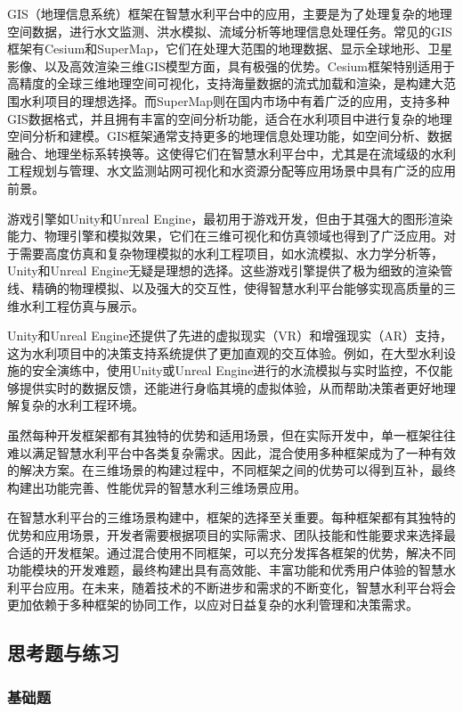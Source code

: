 GIS（地理信息系统）框架在智慧水利平台中的应用，主要是为了处理复杂的地理空间数据，进行水文监测、洪水模拟、流域分析等地理信息处理任务。常见的GIS框架有Cesium和SuperMap，它们在处理大范围的地理数据、显示全球地形、卫星影像、以及高效渲染三维GIS模型方面，具有极强的优势。Cesium框架特别适用于高精度的全球三维地理空间可视化，支持海量数据的流式加载和渲染，是构建大范围水利项目的理想选择。而SuperMap则在国内市场中有着广泛的应用，支持多种GIS数据格式，并且拥有丰富的空间分析功能，适合在水利项目中进行复杂的地理空间分析和建模。GIS框架通常支持更多的地理信息处理功能，如空间分析、数据融合、地理坐标系转换等。这使得它们在智慧水利平台中，尤其是在流域级的水利工程规划与管理、水文监测站网可视化和水资源分配等应用场景中具有广泛的应用前景。

游戏引擎如Unity和Unreal Engine，最初用于游戏开发，但由于其强大的图形渲染能力、物理引擎和模拟效果，它们在三维可视化和仿真领域也得到了广泛应用。对于需要高度仿真和复杂物理模拟的水利工程项目，如水流模拟、水力学分析等，Unity和Unreal Engine无疑是理想的选择。这些游戏引擎提供了极为细致的渲染管线、精确的物理模拟、以及强大的交互性，使得智慧水利平台能够实现高质量的三维水利工程仿真与展示。

Unity和Unreal Engine还提供了先进的虚拟现实（VR）和增强现实（AR）支持，这为水利项目中的决策支持系统提供了更加直观的交互体验。例如，在大型水利设施的安全演练中，使用Unity或Unreal Engine进行的水流模拟与实时监控，不仅能够提供实时的数据反馈，还能进行身临其境的虚拟体验，从而帮助决策者更好地理解复杂的水利工程环境。

虽然每种开发框架都有其独特的优势和适用场景，但在实际开发中，单一框架往往难以满足智慧水利平台中各类复杂需求。因此，混合使用多种框架成为了一种有效的解决方案。在三维场景的构建过程中，不同框架之间的优势可以得到互补，最终构建出功能完善、性能优异的智慧水利三维场景应用。

在智慧水利平台的三维场景构建中，框架的选择至关重要。每种框架都有其独特的优势和应用场景，开发者需要根据项目的实际需求、团队技能和性能要求来选择最合适的开发框架。通过混合使用不同框架，可以充分发挥各框架的优势，解决不同功能模块的开发难题，最终构建出具有高效能、丰富功能和优秀用户体验的智慧水利平台应用。在未来，随着技术的不断进步和需求的不断变化，智慧水利平台将会更加依赖于多种框架的协同工作，以应对日益复杂的水利管理和决策需求。

\subsection{思考题与练习}\label{ux601dux8003ux9898ux4e0eux7ec3ux4e60-3}

\subsubsection{基础题}\label{ux57faux7840ux9898-3}

